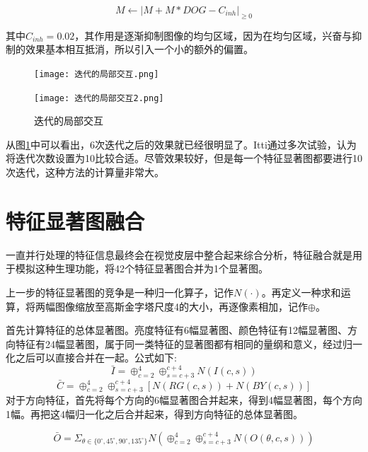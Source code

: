 \documentclass[a4paper,12pt]{article}
\begin{document}
\begin{equation}
M\leftarrow|M+M*DOG-C_{inh}|_{\geq 0}
\end{equation}

其中$C_{inh}=0.02$，其作用是逐渐抑制图像的均匀区域，因为在均匀区域，兴奋与抑制的效果基本相互抵消，所以引入一个小的额外的偏置。

\begin{figure}[!ht]
\begin{minipage}[c]{1.0\textwidth}
\centering
\texttt{[image: 迭代的局部交互.png]}
\end{minipage}
\hspace{1ex}
\begin{minipage}[c]{1.0\textwidth}
\centering
\texttt{[image: 迭代的局部交互2.png]}
\end{minipage}
\caption{迭代的局部交互}\label{fig:10}
\end{figure} 

从图\ref{fig:10}中可以看出，6次迭代之后的效果就已经很明显了。Itti通过多次试验，认为将迭代次数设置为10比较合适。尽管效果较好，但是每一个特征显著图都要进行10次迭代，这种方法的计算量非常大。

\section{特征显著图融合}

一直并行处理的特征信息最终会在视觉皮层中整合起来综合分析，特征融合就是用于模拟这种生理功能，将42个特征显著图合并为1个显著图。


上一步的特征显著图的竞争是一种归一化算子，记作$N(\cdot)$。再定义一种求和运算，将两幅图像缩放至高斯金字塔尺度4的大小，再逐像素相加，记作$\oplus$。


首先计算特征的总体显著图。亮度特征有6幅显著图、颜色特征有12幅显著图、方向特征有24幅显著图，属于同一类特征的显著图都有相同的量纲和意义，经过归一化之后可以直接合并在一起。公式如下:
\begin{equation}
\bar{I}=\oplus_{c=2}^{4}\oplus_{s=c+3}^{c+4}N(I(c,s))
\end{equation}
\begin{equation}
\bar{C}=\oplus_{c=2}^{4}\oplus_{s=c+3}^{c+4}[N(RG(c,s))+N(BY(c,s))]
\end{equation}
对于方向特征，首先将每个方向的6幅显著图合并起来，得到4幅显著图，每个方向1幅。再把这4幅归一化之后合并起来，得到方向特征的总体显著图。

\begin{equation}
\bar{O}=\Sigma_{\theta\in\{0^\circ,45^\circ,90^\circ,135^\circ \}}N(\oplus_{c=2}^{4}\oplus_{s=c+3}^{c+4}N(O(\theta,c,s)))
\end{equation}
\end{document}
